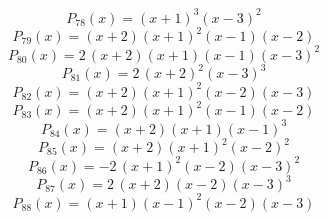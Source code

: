 \subitem \begin{dmath*}P_{78}(x) = {\left(x + 1\right)}^{3} {\left(x - 3\right)}^{2} \end{dmath*}\vspace{-1.2cm}
\subitem \begin{dmath*}P_{79}(x) = {\left(x + 2\right)} {\left(x + 1\right)}^{2} {\left(x - 1\right)} {\left(x - 2\right)} \end{dmath*}\vspace{-1.2cm}
\subitem \begin{dmath*}P_{80}(x) = 2 \, {\left(x + 2\right)} {\left(x + 1\right)} {\left(x - 1\right)} {\left(x - 3\right)}^{2} \end{dmath*}\vspace{-1.2cm}
\subitem \begin{dmath*}P_{81}(x) = 2 \, {\left(x + 2\right)}^{2} {\left(x - 3\right)}^{3} \end{dmath*}\vspace{-1.2cm}
\subitem \begin{dmath*}P_{82}(x) = {\left(x + 2\right)} {\left(x + 1\right)}^{2} {\left(x - 2\right)} {\left(x - 3\right)} \end{dmath*}\vspace{-1.2cm}
\subitem \begin{dmath*}P_{83}(x) = {\left(x + 2\right)} {\left(x + 1\right)}^{2} {\left(x - 1\right)} {\left(x - 2\right)} \end{dmath*}\vspace{-1.2cm}
\subitem \begin{dmath*}P_{84}(x) = {\left(x + 2\right)} {\left(x + 1\right)} {\left(x - 1\right)}^{3} \end{dmath*}\vspace{-1.2cm}
\subitem \begin{dmath*}P_{85}(x) = {\left(x + 2\right)} {\left(x + 1\right)}^{2} {\left(x - 2\right)}^{2} \end{dmath*}\vspace{-1.2cm}
\subitem \begin{dmath*}P_{86}(x) = -2 \, {\left(x + 1\right)}^{2} {\left(x - 2\right)} {\left(x - 3\right)}^{2} \end{dmath*}\vspace{-1.2cm}
\subitem \begin{dmath*}P_{87}(x) = 2 \, {\left(x + 2\right)} {\left(x - 2\right)} {\left(x - 3\right)}^{3} \end{dmath*}\vspace{-1.2cm}
\subitem \begin{dmath*}P_{88}(x) = {\left(x + 1\right)} {\left(x - 1\right)}^{2} {\left(x - 2\right)} {\left(x - 3\right)} \end{dmath*}\vspace{-1.2cm}
